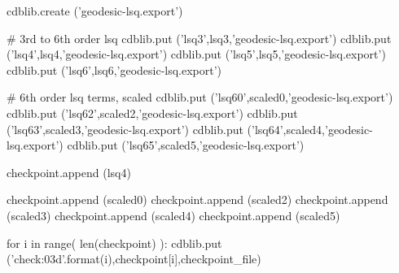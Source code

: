 \documentclass[12pt]{cdblatex}
\begin{document}
\clearpage


\begin{cadabra}
   cdblib.create ('geodesic-lsq.export')

   # 3rd to 6th order lsq
   cdblib.put ('lsq3',lsq3,'geodesic-lsq.export')
   cdblib.put ('lsq4',lsq4,'geodesic-lsq.export')
   cdblib.put ('lsq5',lsq5,'geodesic-lsq.export')
   cdblib.put ('lsq6',lsq6,'geodesic-lsq.export')

   # 6th order lsq terms, scaled
   cdblib.put ('lsq60',scaled0,'geodesic-lsq.export')
   cdblib.put ('lsq62',scaled2,'geodesic-lsq.export')
   cdblib.put ('lsq63',scaled3,'geodesic-lsq.export')
   cdblib.put ('lsq64',scaled4,'geodesic-lsq.export')
   cdblib.put ('lsq65',scaled5,'geodesic-lsq.export')

   checkpoint.append (lsq4)

   checkpoint.append (scaled0)
   checkpoint.append (scaled2)
   checkpoint.append (scaled3)
   checkpoint.append (scaled4)
   checkpoint.append (scaled5)
\end{cadabra}


\bgroup
{}
\begin{cadabra}
   for i in range( len(checkpoint) ):
      cdblib.put ('check{:03d}'.format(i),checkpoint[i],checkpoint_file)
\end{cadabra}
\egroup
\end{document}
